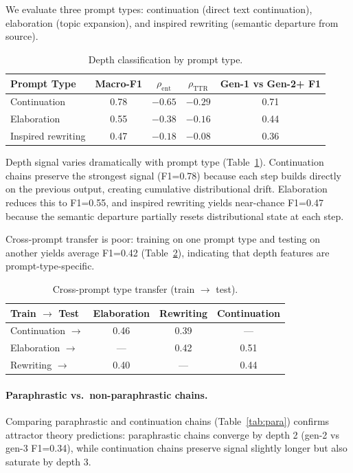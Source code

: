 \documentclass[11pt]{article}
\begin{document}
We evaluate three prompt types: continuation (direct text continuation), elaboration (topic expansion), and inspired rewriting (semantic departure from source).

\begin{table}[h]
\centering
\caption{Depth classification by prompt type.}
\label{tab:prompt}
\begin{tabular}{lcccc}
\toprule
Prompt Type & Macro-F1 & $\rho_{\text{ent}}$ & $\rho_{\text{TTR}}$ & Gen-1 vs Gen-2+ F1 \\
\midrule
Continuation & 0.78 & $-0.65$ & $-0.29$ & 0.71 \\
Elaboration & 0.55 & $-0.38$ & $-0.16$ & 0.44 \\
Inspired rewriting & 0.47 & $-0.18$ & $-0.08$ & 0.36 \\
\bottomrule
\end{tabular}
\end{table}

Depth signal varies dramatically with prompt type (Table~\ref{tab:prompt}).
Continuation chains preserve the strongest signal (F1=0.78) because each step builds directly on the previous output, creating cumulative distributional drift.
Elaboration reduces this to F1=0.55, and inspired rewriting yields near-chance F1=0.47 because the semantic departure partially resets distributional state at each step.

Cross-prompt transfer is poor: training on one prompt type and testing on another yields average F1=0.42 (Table~\ref{tab:prompt_transfer}), indicating that depth features are prompt-type-specific.

\begin{table}[h]
\centering
\caption{Cross-prompt type transfer (train $\to$ test).}
\label{tab:prompt_transfer}
\begin{tabular}{lccc}
\toprule
Train $\to$ Test & Elaboration & Rewriting & Continuation \\
\midrule
Continuation $\to$ & 0.46 & 0.39 & --- \\
Elaboration $\to$ & --- & 0.42 & 0.51 \\
Rewriting $\to$ & 0.40 & --- & 0.44 \\
\bottomrule
\end{tabular}
\end{table}

\paragraph{Paraphrastic vs.\ non-paraphrastic chains.}
Comparing paraphrastic and continuation chains (Table~\ref{tab:para}) confirms attractor theory predictions: paraphrastic chains converge by depth 2 (gen-2 vs gen-3 F1=0.34), while continuation chains preserve signal slightly longer but also saturate by depth 3.
\end{document}
